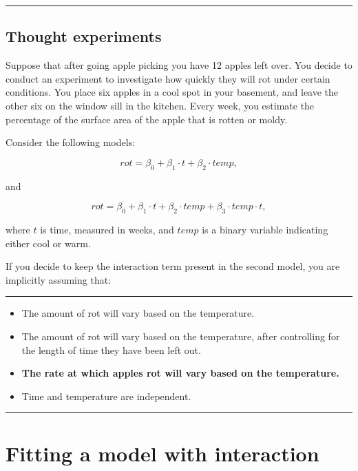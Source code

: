 \documentclass[]{book}
\begin{document}
\begin{center}\rule{0.5\linewidth}{\linethickness}\end{center}

\subsection*{Thought experiments}\label{thought-experiments}

Suppose that after going apple picking you have 12 apples left over. You
decide to conduct an experiment to investigate how quickly they will rot
under certain conditions. You place six apples in a cool spot in your
basement, and leave the other six on the window sill in the kitchen.
Every week, you estimate the percentage of the surface area of the apple
that is rotten or moldy.

Consider the following models:

\[rot=\beta_0 + \beta_1\cdot t + \beta_2 \cdot temp,\]

and

\[rot=\beta_0 + \beta_1\cdot t + \beta_2 \cdot temp + \beta_3 \cdot temp \cdot t,\]

where \(t\) is time, measured in weeks, and \(temp\) is a binary
variable indicating either cool or warm.

If you decide to keep the interaction term present in the second model,
you are implicitly assuming that:

\begin{center}\rule{0.5\linewidth}{\linethickness}\end{center}

\begin{itemize}
\item
  The amount of rot will vary based on the temperature.
\item
  The amount of rot will vary based on the temperature, after
  controlling for the length of time they have been left out.
\item
  \textbf{The rate at which apples rot will vary based on the
  temperature.}
\item
  Time and temperature are independent.
\end{itemize}

\begin{center}\rule{0.5\linewidth}{\linethickness}\end{center}

\section{Fitting a model with
interaction}\label{fitting-a-model-with-interaction}
\end{document}
